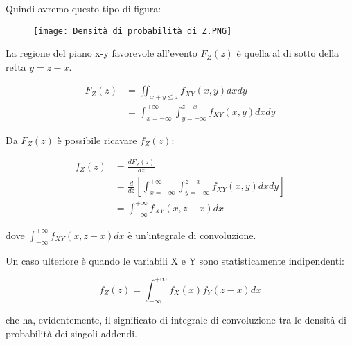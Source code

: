 Quindi avremo questo tipo di figura: 

\begin{figure}[h]
    \centering
    \texttt{[image: Densità di probabilità di Z.PNG]}
\end{figure} 

La regione del piano x-y favorevole all'evento $F_Z (z)$ è quella al di sotto della retta 
$y = z - x$. \newline 

{
    \Large 
    \begin{equation}
        \begin{split}
            F_Z (z) 
            &=
            \iint_{x + y \leq z} 
            f_{XY} (x, y) 
            dx dy 
            \\ 
            &= 
            \int_{x = -\infty}^{+ \infty}
            \int_{y = -\infty}^{z - x} 
            f_{XY} (x, y) 
            dx dy
        \end{split}
    \end{equation}
}


Da $F_Z (z)$ è possibile ricavare $f_Z (z)$: 

{
    \Large 
    \begin{equation}
        \begin{split}
            f_Z (z) 
            &= 
            \frac{d F_Z (z)}{dz}
            \\ 
            &= 
            \frac{d}{dz}
            [\int_{x = -\infty}^{+ \infty}
            \int_{y = -\infty}^{z - x} 
            f_{XY} (x, y) 
            dx dy]
            \\ 
            &= 
            \int_{- \infty}^{+ \infty}
            f_{XY} (x, z - x)
            dx
        \end{split}
    \end{equation}
}

dove $\int_{- \infty}^{+ \infty} f_{XY} (x, z - x) dx$ è un'integrale di convoluzione. \newline 

Un caso ulteriore è quando le variabili X e Y sono statisticamente indipendenti: 

{
    \Large 
    \begin{equation}
        f_Z (z)
        = 
        \int_{- \infty}^{+ \infty}
        f_X (x) f_Y (z - x)
        dx
    \end{equation}
}

che ha, evidentemente, il significato di integrale di convoluzione tra le densità di 
probabilità dei singoli addendi. \newline 

